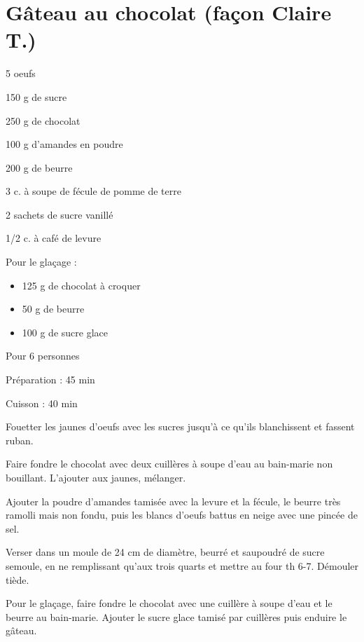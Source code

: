 \section[\normalsize{Gâteau au chocolat (façon Claire T.)}]{Gâteau au chocolat (façon Claire T.)}
\begin{ingredients}
\item 5 oeufs
\item 150 g de sucre
\item 250 g de chocolat
\item 100 g d'amandes en poudre
\item 200 g de beurre
\item 3 c. \`a soupe de f\'ecule de pomme de terre
\item 2 sachets de sucre vanill\'e
\item 1/2 c. \`a caf\'e de levure
\item Pour le glaçage :
\begin{itemize}
\item 125 g de chocolat \`a croquer
\item 50 g de beurre
\item 100 g de sucre glace
\end{itemize}
\end{ingredients}
\begin{infos}
\item Pour 6 personnes
\item Préparation : 45 min
\item Cuisson : 40 min
\end{infos}
\begin{etapes}
\item Fouetter les jaunes d'oeufs avec les sucres jusqu'\`a ce qu'ils blanchissent et fassent ruban.
\item Faire fondre le chocolat avec deux cuill\`eres \`a soupe d'eau au bain-marie non bouillant. L'ajouter aux jaunes, m\'elanger.
\item Ajouter la poudre d'amandes tamis\'ee avec la levure et la f\'ecule, le beurre tr\`es ramolli mais non fondu, puis les blancs d'oeufs battus en neige avec une pinc\'ee de sel.
\item Verser dans un moule de 24 cm de diam\`etre, beurr\'e et saupoudr\'e de sucre semoule, en ne remplissant qu'aux trois quarts et mettre au four th 6-7. D\'emouler ti\`ede.
\item Pour le glaçage, faire fondre le chocolat avec une cuill\`ere \`a soupe d'eau et le beurre au bain-marie. Ajouter le sucre glace tamis\'e par cuill\`eres puis enduire le g\^ateau.
\end{etapes}
\begin{conseils}
\end{conseils}
